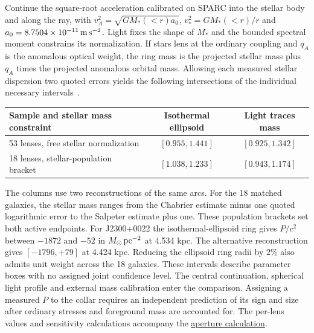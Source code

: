 \documentclass[11pt]{article}
\begin{document}
Continue the square-root acceleration calibrated on SPARC into the
stellar body and along the ray, with $v_A^2=\sqrt{GM_*(<r)a_0}$,
$v_*^2=GM_*(<r)/r$ and $a_0=8.7504\times10^{-11}\,{\rm m\,s^{-2}}$.
Light fixes the shape of $M_*$ and the bounded spectral moment constrains
its normalization. If stars lens at the ordinary coupling and $q_A$
is the anomalous optical weight, the ring mass is the projected stellar mass
plus $q_A$ times the projected anomalous orbital mass. Allowing each
measured stellar dispersion two quoted errors yields the following
intersections of the individual necessary intervals~\cite{bolton2008,auger2009}.
\begin{center}
\begin{tabular}{lcc}
\hline
Sample and stellar mass constraint & Isothermal ellipsoid & Light traces mass\\
\hline
53 lenses, free stellar normalization & $[0.955,1.441]$ & $[0.925,1.342]$\\
18 lenses, stellar-population bracket & $[1.038,1.233]$ & $[0.943,1.174]$\\
\hline
\end{tabular}
\end{center}
The columns use two reconstructions of the same arcs. For the 18
matched galaxies, the stellar mass ranges from the Chabrier estimate
minus one quoted logarithmic error to the Salpeter estimate plus one.
These population brackets set both active endpoints. For J2300+0022
the isothermal-ellipsoid ring gives $P/c^2$ between $-1872$ and $-52$
in $M_\odot\,{\rm pc}^{-2}$ at 4.534 kpc. The alternative reconstruction
gives $[-1796,+79]$ at 4.424 kpc. Reducing the ellipsoid ring radii
by $2\%$ also admits unit weight across the 18 galaxies. These
intervals describe parameter boxes with no assigned joint confidence
level. The central continuation, spherical light profile and
external mass calibration enter the comparison. Assigning a measured
$P$ to the collar requires an independent prediction of its sign and
size after ordinary stresses and foreground mass are accounted for.
The per-lens values and sensitivity calculations accompany the
\href{https://github.com/FloatingPragma/observer-patch-holography/tree/main/code/cosmology/rar_deep_regime/aperture_virial}{aperture calculation}.
\end{document}
